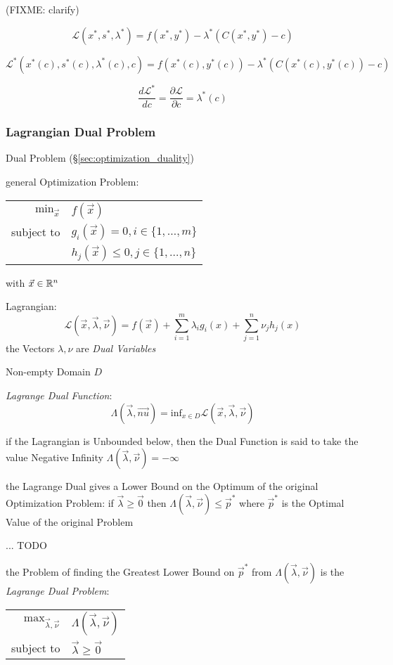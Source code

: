 (FIXME: clarify)

\[
  \mathcal{L}(x^*,s^*,\lambda^*) = f(x^*,y^*) - \lambda^*(C(x^*,y^*)-c)
\]

\[
  \mathcal{L}^*(x^*(c),s^*(c),\lambda^*(c), c)
    = f(x^*(c),y^*(c)) - \lambda^*(C(x^*(c),y^*(c))-c)
\]

\[
  \frac{d\mathcal{L}^*}{dc} = \frac{\partial{\mathcal{L}}}{\partial{c}} =
  \lambda^*(c)
\]



\subsubsection{Lagrangian Dual Problem}\label{sec:lagrangian_dual}

Dual Problem (\S\ref{sec:optimization_duality})

general Optimization Problem:

\begin{tabular}{r l}
  $\mathrm{min}_{\vec{x}}$ & $f(\vec{x})$      \\
  subject to               & $g_i(\vec{x}) = 0, i \in \{1,\ldots,m\}$ \\
                           & $h_j(\vec{x}) \leq 0, j \in \{1,\ldots,n\}$
\end{tabular}

with $\vec{x} \in \mathbb{R}^n$

Lagrangian:
\[
  \mathcal{L}(\vec{x},\vec{\lambda},\vec{\nu}) =
    f(\vec{x}) + \sum_{i=1}^m\lambda_i g_i(x) + \sum_{j=1}^n \nu_j h_j(x)
\]
the Vectors $\lambda, \nu$ are \emph{Dual Variables}

Non-empty Domain $D$

\emph{Lagrange Dual Function}:
\[
  \Lambda(\vec{\lambda}, \vec{nu}) =
    \mathrm{inf}_{x \in D} \mathcal{L}(\vec{x},\vec{\lambda},\vec{\nu})
\]

if the Lagrangian is Unbounded below, then the Dual Function is said to take
the value Negative Infinity $\Lambda(\vec{\lambda}, \vec{\nu}) = -\infty$

the Lagrange Dual gives a Lower Bound on the Optimum of the original
Optimization Problem: if $\vec{\lambda} \geq \vec{0}$ then
$\Lambda(\vec{\lambda}, \vec{\nu}) \leq \vec{p}^*$ where $\vec{p}^*$ is the
Optimal Value of the original Problem

... TODO

the Problem of finding the Greatest Lower Bound on $\vec{p}^*$ from
$\Lambda(\vec{\lambda},\vec{\nu})$ is the \emph{Lagrange Dual Problem}:
\begin{tabular}{r l}
  $\mathrm{max}_{\vec{\lambda},\vec{\nu}}$ &
    $\Lambda(\vec{\lambda},\vec{\nu})$ \\
  subject to & $\vec{\lambda} \geq \vec{0}$ \\
\end{tabular}

